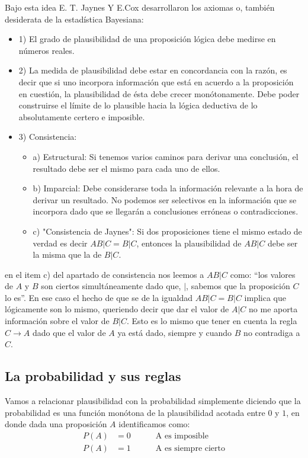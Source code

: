 \documentclass[aps,onecolumn,12pt,notitlepage]{revtex4-1}
\begin{document}
Bajo esta idea E. T. Jaynes Y E.Cox desarrollaron los axiomas o, también desiderata de la estadística Bayesiana:
\begin{itemize}
\item 1)  El grado de plausibilidad de una proposición lógica debe medirse en números reales.
\item 2) La medida de plausibilidad debe estar en concordancia con la razón, es decir que si uno incorpora información que está en acuerdo a la proposición en cuestión, la plausibilidad de ésta debe crecer monótonamente. Debe poder construirse el límite de lo plausible hacia la lógica deductiva de lo absolutamente certero e imposible.
\item 3) Consistencia:
	\begin{itemize}
	\item a) Estructural: Si tenemos varios caminos para derivar una conclusión, el resultado debe ser el mismo para cada uno de ellos.
	\item b) Imparcial: Debe considerarse toda la información relevante a la hora de derivar un resultado. No podemos ser selectivos en la información que se incorpora dado que se llegarán a conclusiones erróneas o contradicciones.
	\item c) "Consistencia de Jaynes": Si dos proposiciones tiene el mismo estado de verdad es decir $AB|C = B|C$, entonces la plausibilidad de $AB|C$ debe ser la misma que la de $B|C$.
	\end{itemize}
\end{itemize}
en el item c) del apartado de consistencia nos leemos a $AB|C$ como: ``los valores de $A$ y $B$ son ciertos simultáneamente dado que, $|$, sabemos que la proposición $C$ lo es''. En ese caso el hecho de que se de la igualdad $AB|C = B|C$  implica que lógicamente son lo mismo, queriendo decir que dar el valor de $A|C$ no me aporta información sobre el valor de $B|C$. Esto es lo mismo que tener en cuenta la regla $C \rightarrow A$ dado que el valor de $A$ ya está dado, siempre y cuando $B$ no contradiga a $C$.

\subsection{La probabilidad y sus reglas}
Vamos a relacionar plausibilidad con la probabilidad simplemente diciendo que la probabilidad es una función monótona de la plausibilidad acotada entre $0$ y $1$, en donde dada una proposición $A$ identificamos como:
\begin{align}
P(A) &= 0 \quad\quad\quad \text{A es imposible}\\ 
P(A) &= 1 \quad\quad\quad \text{A es siempre cierto} 
\end{align}
\end{document}

